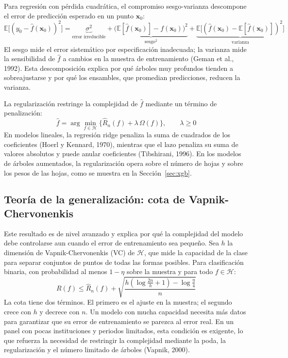Para regresión con pérdida cuadrática, el compromiso sesgo-varianza descompone el error de predicción esperado en un punto $\mathbf{x}_0$:
\begin{equation}
\mathbb{E}\big[(y_0-\hat{f}(\mathbf{x}_0))^2\big] = \underbrace{\sigma^2}_{\text{error irreducible}} + \underbrace{\big(\mathbb{E}[\hat{f}(\mathbf{x}_0)]-f(\mathbf{x}_0)\big)^2}_{\text{sesgo}^2} + \underbrace{\mathbb{E}\big[(\hat{f}(\mathbf{x}_0)-\mathbb{E}[\hat{f}(\mathbf{x}_0)])^2\big]}_{\text{varianza}}
\label{eq:sesgo_varianza}
\end{equation}
El sesgo mide el error sistemático por especificación inadecuada; la varianza mide la sensibilidad de $\hat{f}$ a cambios en la muestra de entrenamiento (Geman et al., 1992). Esta descomposición explica por qué árboles muy profundos tienden a sobreajustarse y por qué los ensambles, que promedian predicciones, reducen la varianza.

La regularización restringe la complejidad de $\hat{f}$ mediante un término de penalización:
\begin{equation}
\hat{f} = \arg\min_{f\in\mathcal{H}} \Big\{\widehat{R}_n(f) + \lambda\,\Omega(f)\Big\}, \qquad \lambda \geq 0
\label{eq:regularizacion}
\end{equation}
En modelos lineales, la regresión ridge penaliza la suma de cuadrados de los coeficientes (Hoerl y Kennard, 1970), mientras que el lazo penaliza su suma de valores absolutos y puede anular coeficientes (Tibshirani, 1996). En los modelos de árboles aumentados, la regularización opera sobre el número de hojas y sobre los pesos de las hojas, como se muestra en la Sección~\ref{sec:xgb}.

\subsection{Teoría de la generalización: cota de Vapnik-Chervonenkis}
Este resultado es de nivel avanzado y explica por qué la complejidad del modelo debe controlarse aun cuando el error de entrenamiento sea pequeño. Sea $h$ la dimensión de Vapnik-Chervonenkis (VC) de $\mathcal{H}$, que mide la capacidad de la clase para separar conjuntos de puntos de todas las formas posibles. Para clasificación binaria, con probabilidad al menos $1-\eta$ sobre la muestra y para todo $f\in\mathcal{H}$:
\begin{equation}
R(f) \leq \widehat{R}_n(f) + \sqrt{\frac{h\left(\log\frac{2n}{h}+1\right)-\log\frac{\eta}{4}}{n}}
\label{eq:vc}
\end{equation}
La cota tiene dos términos. El primero es el ajuste en la muestra; el segundo crece con $h$ y decrece con $n$. Un modelo con mucha capacidad necesita más datos para garantizar que su error de entrenamiento se parezca al error real. En un panel con pocas instituciones y periodos limitados, esta condición es exigente, lo que refuerza la necesidad de restringir la complejidad mediante la poda, la regularización y el número limitado de árboles (Vapnik, 2000).

